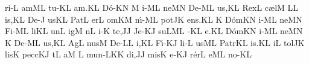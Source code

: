\sgn ri-\punctum L\egn
\sgn {}am\clivis ML\egn
\spatium
\sgn t{u}-\punctum K\augmentum L\egn
\sgn {}a{m.}\punctum K\augmentum L\egn
\spatium
\divisiofinalis
\spatium
\sgn D{\'o}-\pes KN\egn
\custos M
\lineaproxima
{}i-\clivis ML\egn
\sgn ne{}\pes MN\egn
\spatium
\sgn D{e}-\clivis ML\egn
\sgn {}u{s,}\punctum K\augmentum L\egn
\spatium
\divisiominima
\spatium
\sgn Rex\punctum L\egn
\spatium
\sgn c{\ae}l\punctum M\egn
{}\punctum L\augmentum L\egn
\sgn {}i{s,}\punctum K\augmentum L\egn
\spatium
\divisiominima
\spatium
\sgn D{e}-\punctum J\egn
\sgn {}us\pes KL\egn
\spatium
\sgn P{a}t\punctum L\egn
\sgn {}er\punctum L\egn
\spatium
\sgn {}om\pes KM\egn
\sgn n{\'\i}-\clivis ML\egn
\sgn pot\pes JK\egn
\sgn {}e{ns.}\punctum K\augmentum L\egn
\spatium
\divisiofinalis
\spatium
\custos K
\lineaproxima
\sgn D{\'o}m\pes KN\egn
\sgn {}i-\clivis ML\egn
\sgn ne{}\pes MN\egn
\spatium
\sgn F{i}-\clivis ML\egn
\sgn li{}\punctum K\augmentum L\egn
\spatium
\divisiominima
\spatium
\sgn {}un\punctum L\egn
\sgn {}ig\punctum M\egn
{}n\punctum L\egn
\sgn {}i-\punctum K\egn
\sgn te,\punctum J\augmentum J\egn
\spatium
\divisiominima
\spatium
\sgn J{e}-\clivis KJ\egn
\sgn su{}\torculus LML\egn
\spatium
{}-\punctum K\augmentum L\egn
{}e.\punctum K\augmentum L\egn
\spatium
\divisiofinalis
\spatium
\sgn D{\'o}m\pes KN\egn
\sgn {}i-\clivis ML\egn
\sgn ne{}\pes MN\egn
\spatium
\custos K
\lineaproxima
\sgn D{e}-\clivis ML\egn
\sgn {}u{s,}\punctum K\augmentum L\egn
\spatium
\divisiominima
\spatium
\sgn {}Ag\punctum L\egn
\sgn nus\punctum M\egn
\spatium
\sgn D{e}-\punctum L\augmentum L\egn
\sgn {}i,\punctum K\augmentum L\egn
\spatium
\divisiominima
\spatium
\sgn F{\'\i}-\clivis KJ\egn
\sgn li-\punctum L\egn
\sgn {}us\clivis ML\egn
\spatium
\sgn P{a}{tr}\punctum K\augmentum L\egn
\sgn {}i{s.}\punctum K\augmentum L\egn
\spatium
\divisiofinalis
\spatium
{}i{}\punctum L\egn
\spatium
\sgn t{o}l\pes JK\egn
\sgn lis\punctum K\egn
\spatium
\sgn pe{cc}\clivis KJ\egn
{}t\punctum L\egn
\sgn {}a{}\punctum M\egn
\spatium
\custos L
\lineaproxima
\sgn m{u}{n-}\clivis LK\punctum K\egn
\sgn di,\punctum J\augmentum J\egn
\spatium
\divisiominima
\spatium
\sgn mis\punctum K\egn
\sgn {}e-\clivis KJ\egn
\sgn r{\'e}r\punctum L\egn
\sgn {}e{}\clivis ML\egn
\spatium
\sgn n{o}-\punctum K\augmentum L\egn
